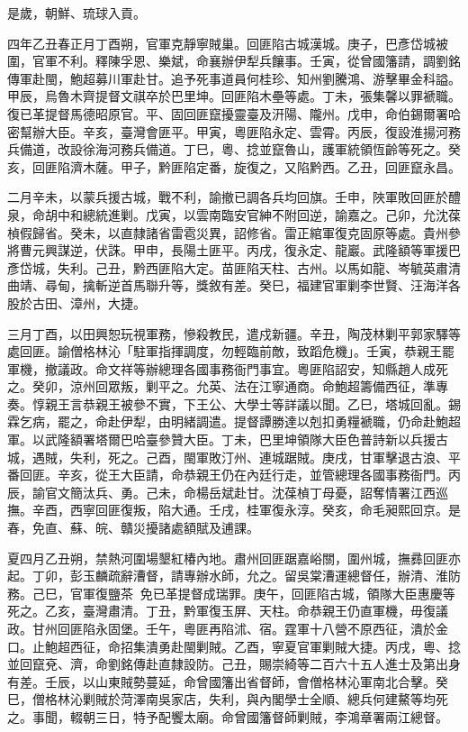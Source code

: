 \begin{pinyinscope}
是歲，朝鮮、琉球入貢。

四年乙丑春正月丁酉朔，官軍克靜寧賊巢。回匪陷古城漢城。庚子，巴彥岱城被圍，官軍不利。釋陳孚恩、樂斌，命襄辦伊犁兵饟事。壬寅，從曾國籓請，調劉銘傳軍赴閩，鮑超募川軍赴甘。追予死事道員何桂珍、知州劉騰鴻、游擊畢金科謚。甲辰，烏魯木齊提督文祺卒於巴里坤。回匪陷木壘等處。丁未，張集馨以罪褫職。復已革提督馬德昭原官。平、固回匪竄擾靈臺及汧陽、隴州。戊申，命伯錫爾署哈密幫辦大臣。辛亥，臺灣會匪平。甲寅，粵匪陷永定、雲霄。丙辰，復設淮揚河務兵備道，改設徐海河務兵備道。丁巳，粵、捻並竄魯山，護軍統領恆齡等死之。癸亥，回匪陷濟木薩。甲子，黔匪陷定番，旋復之，又陷黔西。乙丑，回匪竄永昌。

二月辛未，以蒙兵援古城，戰不利，諭撤已調各兵均回旗。壬申，陜軍敗回匪於醴泉，命胡中和總統進剿。戊寅，以雲南臨安官紳不附回逆，諭嘉之。己卯，允沈葆楨假歸省。癸未，以直隸諸省雷雹災異，詔修省。雷正綰軍復克固原等處。貴州參將曹元興謀逆，伏誅。甲申，長陽土匪平。丙戌，復永定、龍巖。武隆額等軍援巴彥岱城，失利。己丑，黔西匪陷大定。苗匪陷天柱、古州。以馬如龍、岑毓英肅清曲靖、尋甸，擒斬逆首馬聯升等，獎敘有差。癸巳，福建官軍剿李世賢、汪海洋各股於古田、漳州，大捷。

三月丁酉，以田興恕玩視軍務，慘殺教民，遣戍新疆。辛丑，陶茂林剿平郭家驛等處回匪。諭僧格林沁「駐軍指揮調度，勿輕臨前敵，致蹈危機」。壬寅，恭親王罷軍機，撤議政。命文祥等辦總理各國事務衙門事宜。粵匪陷詔安，知縣趙人成死之。癸卯，涼州回眾叛，剿平之。允英、法在江寧通商。命鮑超籌備西征，準專奏。惇親王言恭親王被參不實，下王公、大學士等詳議以聞。乙巳，塔城回亂。錫霖乞病，罷之，命赴伊犁，由明緒調遣。提督譚勝達以剋扣勇糧褫職，仍命赴鮑超軍。以武隆額署塔爾巴哈臺參贊大臣。丁未，巴里坤領隊大臣色普詩新以兵援古城，遇賊，失利，死之。己酉，閩軍敗汀州、連城踞賊。庚戌，甘軍擊退古浪、平番回匪。辛亥，從王大臣請，命恭親王仍在內廷行走，並管總理各國事務衙門。丙辰，諭官文簡汰兵、勇。己未，命楊岳斌赴甘。沈葆楨丁母憂，詔奪情署江西巡撫。辛酉，西寧回匪復叛，陷大通。壬戌，桂軍復永淳。癸亥，命毛昶熙回京。是春，免直、蘇、皖、贛災擾諸處額賦及逋課。

夏四月乙丑朔，禁熱河圍場墾紅椿內地。肅州回匪踞嘉峪關，圍州城，撫彞回匪亦起。丁卯，彭玉麟疏辭漕督，請專辦水師，允之。留吳棠漕運總督任，辦清、淮防務。己巳，官軍復鹽茶，免已革提督成瑞罪。庚午，回匪陷古城，領隊大臣惠慶等死之。乙亥，臺灣肅清。丁丑，黔軍復玉屏、天柱。命恭親王仍直軍機，毋復議政。甘州回匪陷永固堡。壬午，粵匪再陷沭、宿。霆軍十八營不原西征，潰於金口。止鮑超西征，命招集潰勇赴閩剿賊。乙酉，寧夏官軍剿賊大捷。丙戌，粵、捻並回竄兗、濟，命劉銘傳赴直隸設防。己丑，賜崇綺等二百六十五人進士及第出身有差。壬辰，以山東賊勢蔓延，命曾國籓出省督師，會僧格林沁軍南北合擊。癸巳，僧格林沁剿賊於菏澤南吳家店，失利，與內閣學士全順、總兵何建鰲等均死之。事聞，輟朝三日，特予配饗太廟。命曾國籓督師剿賊，李鴻章署兩江總督。


\end{pinyinscope}
